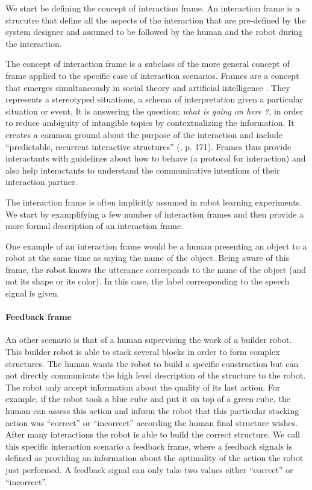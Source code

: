 We start be defining the concept of interaction frame. An interaction frame is a strucutre that define all the aspects of the interaction that are pre-defined by the system designer and assumed to be followed by the human and the robot during the interaction.

The concept of interaction frame is a subclass of the more general concept of frame applied to the specific case of interaction scenarios. Frames are a concept that emerges simultaneously in social theory \cite{goffman1974frame} and artificial intelligence \cite{minsky1974framework}. They represents a stereotyped situations, a schema of interpretation given a particular situation or event. It is answering the question: \emph{what is going on here ?}, in order to reduce ambiguity of intangible topics by contextualizing the information. It creates a common ground about the purpose of the interaction \cite{tomasello2009cultural,rohlfing2013learning} and include ``predictable, recurrent interactive structures'' (\cite{ninio1996pragmatic}, p. 171). Frames thus provide interactants with guidelines about how to behave (a protocol for interaction) and also help interactants to understand the communicative intentions of their interaction partner.

The interaction frame is often implicitly assumed in robot learning experiments. We start by examplifying a few number of interaction frames and then provide a more formal description of an interaction frame.


One example of an interaction frame would be a human presenting an object to a robot at the same time as saying the name of the object. Being aware of this frame, the robot knows the utterance corresponds to the name of the object (and not its shape or its color). In this case, the label corresponding to the speech signal is given.

\paragraph{Feedback frame}
An other scenario is that of a human supervising the work of a builder robot. This builder robot is able to stack several blocks in order to form complex structures. The human wants the robot to build a specific construction but can not directly communicate the high level description of the structure to the robot. The robot only accept information about the quality of its last action. For example, if the robot took a blue cube and put it on top of a green cube, the human can assess this action and inform the robot that this particular stacking action was ``correct'' or ``incorrect'' according the human final structure wishes. After many interactions the robot is able to build the correct structure. We call this specific interaction scenario a feedback frame, where a feedback signals is defined as providing an information about the optimality of the action the robot just performed. A feedback signal can only take two values either ``correct'' or ``incorrect''.

